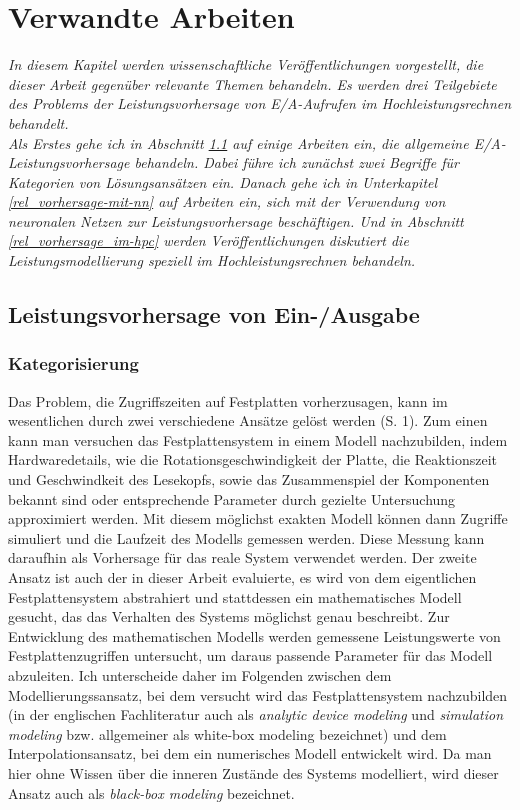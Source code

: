 \documentclass[
	12pt,
	a4paper,
	BCOR10mm,
	DIV14,
	listof=totoc,
	bibliography=totoc,
	headsepline
]{scrreprt}
\begin{document}
\chapter{Verwandte Arbeiten}
\textit{%
	In diesem Kapitel werden wissenschaftliche Veröffentlichungen vorgestellt, die dieser Arbeit gegenüber relevante Themen behandeln. Es werden drei Teilgebiete des Problems der Leistungsvorhersage von E/A-Aufrufen im Hochleistungsrechnen behandelt.\\
	Als Erstes gehe ich in Abschnitt \ref{rel_ea-vorhersage} auf einige Arbeiten ein, die allgemeine E/A-Leistungsvorhersage behandeln. Dabei führe ich zunächst zwei Begriffe für Kategorien von Lösungsansätzen ein. Danach gehe ich in Unterkapitel \ref{rel_vorhersage-mit-nn} auf Arbeiten ein, sich mit der Verwendung von neuronalen Netzen zur Leistungsvorhersage beschäftigen.
	Und in Abschnitt \ref{rel_vorhersage_im-hpc} werden Veröffentlichungen diskutiert die Leistungsmodellierung speziell im Hochleistungsrechnen behandeln.
}
\bigskip

\section{Leistungsvorhersage von Ein-/Ausgabe}
\label{rel_ea-vorhersage}
\subsection{Kategorisierung}
Das Problem, die Zugriffszeiten auf Festplatten vorherzusagen, kann im wesentlichen durch zwei verschiedene Ansätze gelöst werden \cite{Crume:2013:FML:2538542.2538561} (S. 1). Zum einen kann man versuchen das Festplattensystem in einem Modell nachzubilden, indem Hardwaredetails, wie die Rotationsgeschwindigkeit der Platte, die Reaktionszeit und Geschwindkeit des Lesekopfs, sowie das Zusammenspiel der Komponenten bekannt sind oder entsprechende Parameter durch gezielte Untersuchung approximiert werden. Mit diesem möglichst exakten Modell können dann Zugriffe simuliert und die Laufzeit des Modells gemessen werden. Diese Messung kann daraufhin als Vorhersage für das reale System verwendet werden.
Der zweite Ansatz ist auch der in dieser Arbeit evaluierte, es wird von dem eigentlichen Festplattensystem abstrahiert und stattdessen ein mathematisches Modell gesucht, das das Verhalten des Systems möglichst genau beschreibt.
Zur Entwicklung des mathematischen Modells werden gemessene Leistungswerte von Festplattenzugriffen untersucht, um daraus passende Parameter für das Modell abzuleiten.
Ich unterscheide daher im Folgenden zwischen dem Modellierungssansatz, bei dem versucht wird das Festplattensystem nachzubilden (in der englischen Fachliteratur auch als \textit{analytic device modeling} und \textit{simulation modeling} bzw. allgemeiner als white-box modeling bezeichnet) und dem Interpolationsansatz, bei dem ein numerisches Modell entwickelt wird. Da man hier ohne Wissen über die inneren Zustände des Systems modelliert, wird dieser Ansatz auch als \textit{black-box modeling} bezeichnet. 
\end{document}
